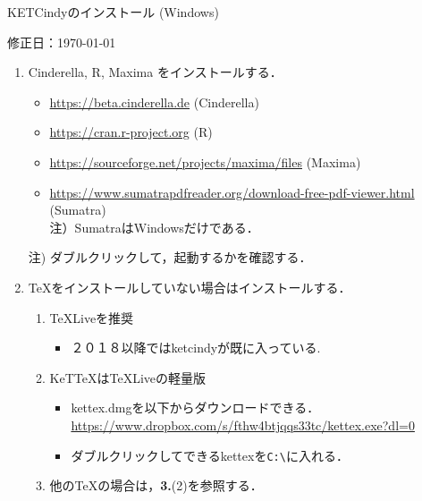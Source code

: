 \documentclass{ujarticle}
\begin{document}
\begin{center}
KETCindyのインストール (Windows)
\end{center}

\hfill 修正日：\today

\begin{enumerate}[\bf\large 1.]
\item Cinderella, R, Maxima をインストールする．
 \begin{itemize}
 \item \url{https://beta.cinderella.de}  (Cinderella)
 \item \url{https://cran.r-project.org}   (R)
 \item \url{https://sourceforge.net/projects/maxima/files}  (Maxima)
 \item \url{https://www.sumatrapdfreader.org/download-free-pdf-viewer.html} (Sumatra)\\ \hspace*{10mm}注）SumatraはWindowsだけである．
 \end{itemize}
 注) ダブルクリックして，起動するかを確認する．

\item TeXをインストールしていない場合はインストールする．
 \begin{enumerate}[(1)]
 \item TeXLiveを推奨
    \begin{itemize}
    \item ２０１８以降ではketcindyが既に入っている.
    \end{itemize}
 \item KeTTeXはTeXLiveの軽量版
    \begin{itemize}
    \item kettex.dmgを以下からダウンロードできる．\\
    \hspace*{10mm}\url{https://www.dropbox.com/s/fthw4btjqqs33tc/kettex.exe?dl=0}
    \item ダブルクリックしてできるkettexを\verb|C:\|に入れる．
    \end{itemize}
 \item 他のTeXの場合は，{\bf 3.}(2)を参照する．
 \end{enumerate}


\end{enumerate}
\end{document}
